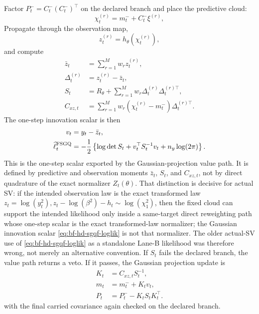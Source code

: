 Factor \(P_t^-=C_t^-(C_t^-)^\top\) on the declared branch and place the
predictive cloud:
\begin{equation}
  \chi_t^{(r)} = m_t^-+C_t^-\xi^{(r)},
  \label{eq:bf-hd-sgqf-obs-placed-points}
\end{equation}
Propagate through the observation map,
\begin{equation}
  z_t^{(r)}=h_\theta(\chi_t^{(r)}),
  \label{eq:bf-hd-sgqf-obs-values}
\end{equation}
and compute
\begin{align}
  \bar z_t&=\sum_{r=1}^Mw_rz_t^{(r)},
  \label{eq:bf-hd-sgqf-obs-mean}\\
  \Delta_t^{(r)}&=z_t^{(r)}-\bar z_t,
  \label{eq:bf-hd-sgqf-obs-centered}\\
  S_t&=R_\theta+\sum_{r=1}^Mw_r
  \Delta_t^{(r)}\Delta_t^{(r)\top},
  \label{eq:bf-hd-sgqf-obs-cov}\\
  C_{xz,t}&=\sum_{r=1}^Mw_r
  (\chi_t^{(r)}-m_t^-)\Delta_t^{(r)\top}.
  \label{eq:bf-hd-sgqf-cross-cov}
\end{align}
The one-step innovation scalar is then
\begin{align}
  v_t&=y_t-\bar z_t,
  \label{eq:bf-hd-sgqf-innovation}\\
  \widehat\ell_t^{\rm FSGQ}
  &=-\frac12
  \left\{\log\det S_t+v_t^\top S_t^{-1}v_t+n_y\log(2\pi)\right\}.
  \label{eq:bf-hd-sgqf-loglik}
\end{align}
This is the one-step scalar exported by the Gaussian-projection value path.  It
is defined by predictive and observation moments \(\bar z_t\), \(S_t\), and
\(C_{xz,t}\), not by direct quadrature of the exact normalizer
\(Z_t(\theta)\).  That distinction is decisive for actual SV: if the intended
observation law is the exact transformed law
\(
 z_t=\log(y_t^2),
 z_t-\log(\beta^2)-h_t\sim\log(\chi_1^2)
\),
then the fixed cloud can support the intended likelihood only inside a
same-target direct reweighting path whose one-step scalar is the exact
transformed-law normalizer; the Gaussian innovation scalar
\eqref{eq:bf-hd-sgqf-loglik} is not that normalizer.  The older
actual-SV use of \eqref{eq:bf-hd-sgqf-loglik} as a standalone Lane-B likelihood
was therefore wrong, not merely an alternative convention.
If \(S_t\) fails the declared branch, the value path returns a veto.  If it
passes, the Gaussian projection update is
\begin{align}
  K_t&=C_{xz,t}S_t^{-1},
  \label{eq:bf-hd-sgqf-kalman-gain}\\
  m_t&=m_t^-+K_tv_t,
  \label{eq:bf-hd-sgqf-filter-mean}\\
  P_t&=P_t^- - K_tS_tK_t^\top.
  \label{eq:bf-hd-sgqf-filter-cov}
\end{align}
with the final carried covariance again checked on the declared branch.

